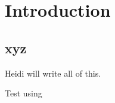 \chapter{Introduction}
\label{ch:intro}

\section{xyz}
\label{sec:intro:xyz}  %

Heidi will write all of this.

Test using 
